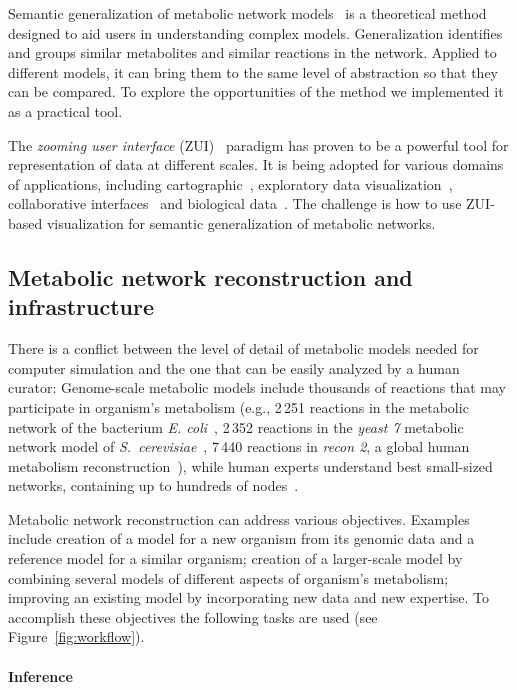 \documentclass{bmcart}
\begin{document}
Semantic generalization of metabolic network models~\cite{Zhukova2014} is a theoretical method designed to aid users in understanding complex models. Generalization identifies and groups similar metabolites and similar reactions in the network.
Applied to different models, it can bring them to the same level of abstraction so that they can be compared.
To explore the opportunities of the method we implemented it as a practical tool.

The \emph{zooming user interface} (ZUI)~\cite{Bederson1998} paradigm has proven to be a powerful tool for representation of data at different scales. It is being adopted for various domains of applications, including cartographic~\cite{Nivala2008}, exploratory data visualization~\cite{Roberts2005}, collaborative interfaces~\cite{Laufer2011} and biological data~\cite{Pook1998, Hu2007}. The challenge is how to use ZUI-based visualization for semantic generalization of metabolic networks.

\subsection*{Metabolic network reconstruction and infrastructure}
There is a conflict between the level of detail of metabolic models needed for computer simulation and the one that can be easily analyzed by a human curator: Genome-scale metabolic models include thousands of reactions that may participate in organism's metabolism (e.g.,  2\,251 reactions in the metabolic network of the bacterium \emph{E. coli}~\cite{Orth2011}, 2\,352 reactions in the \emph{yeast 7} metabolic network model of \emph{S.~cerevisiae}~\cite{Aung2013}, 7\,440 reactions in \emph{recon 2},  a global human metabolism reconstruction~\cite{Thiele2013}), while human experts understand best small-sized networks, containing up to hundreds of nodes~\cite{VonLandesberger2011,Herman2000}.

Metabolic network reconstruction can address various objectives. Examples include creation of a model for a new organism from its genomic data and a reference model for a similar organism; creation of a larger-scale model by combining several models of different aspects of organism's metabolism; improving an existing model by incorporating new data and new expertise. To accomplish these objectives the following tasks are used (see Figure~\ref{fig:workflow}). 

\paragraph{Inference}
\end{document}
